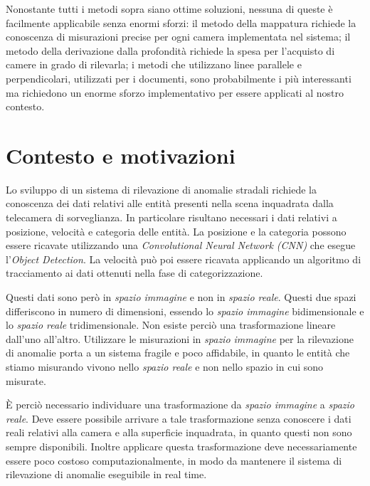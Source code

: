 Nonostante tutti i metodi sopra siano ottime soluzioni, nessuna di queste è facilmente applicabile senza enormi sforzi: il metodo della mappatura richiede la conoscenza di misurazioni precise per ogni camera implementata nel sistema; il metodo della derivazione dalla profondità richiede la spesa per l'acquisto di camere in grado di rilevarla; i metodi che utilizzano linee parallele e perpendicolari, utilizzati per i documenti, sono probabilmente i più interessanti ma richiedono un enorme sforzo implementativo per essere applicati al nostro contesto.

\section{Contesto e motivazioni}

Lo sviluppo di un sistema di rilevazione di anomalie stradali richiede la conoscenza dei dati relativi alle entità presenti nella scena inquadrata dalla telecamera di sorveglianza.
In particolare risultano necessari i dati relativi a posizione, velocità e categoria delle entità.
La posizione e la categoria possono essere ricavate utilizzando una \emph{Convolutional Neural Network (CNN)} che esegue l'\emph{Object Detection}.
La velocità può poi essere ricavata applicando un algoritmo di tracciamento ai dati ottenuti nella fase di categorizzazione.

Questi dati sono però in \emph{spazio immagine} e non in \emph{spazio reale}.
Questi due spazi differiscono in numero di dimensioni, essendo lo \emph{spazio immagine} bidimensionale e lo \emph{spazio reale} tridimensionale.
Non esiste perciò una trasformazione lineare dall'uno all'altro.
Utilizzare le misurazioni in \emph{spazio immagine} per la rilevazione di anomalie porta a un sistema fragile e poco affidabile, in quanto le entità che stiamo misurando vivono nello \emph{spazio reale} e non nello spazio in cui sono misurate.

È perciò necessario individuare una trasformazione da \emph{spazio immagine} a \emph{spazio reale}. Deve essere possibile arrivare a tale trasformazione senza conoscere i dati reali relativi alla camera e alla superficie inquadrata, in quanto questi non sono sempre disponibili. Inoltre applicare questa trasformazione deve necessariamente essere poco costoso computazionalmente, in modo da mantenere il sistema di rilevazione di anomalie eseguibile in real time.


